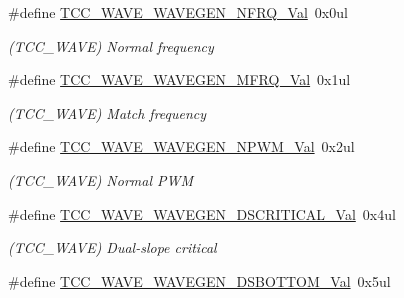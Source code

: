\begin{DoxyCompactItemize}
\item 
\hypertarget{group___s_a_m_l21___t_c_c_gaaf080c2e6207e177b2faf21b266b58b4}{}\#define \hyperlink{group___s_a_m_l21___t_c_c_gaaf080c2e6207e177b2faf21b266b58b4}{T\+C\+C\+\_\+\+W\+A\+V\+E\+\_\+\+W\+A\+V\+E\+G\+E\+N\+\_\+\+N\+F\+R\+Q\+\_\+\+Val}~0x0ul\label{group___s_a_m_l21___t_c_c_gaaf080c2e6207e177b2faf21b266b58b4}

\begin{DoxyCompactList}\small\item\em (T\+C\+C\+\_\+\+W\+A\+V\+E) Normal frequency \end{DoxyCompactList}\item 
\hypertarget{group___s_a_m_l21___t_c_c_ga71f3aa7f2d96d282e8db409c2b611efc}{}\#define \hyperlink{group___s_a_m_l21___t_c_c_ga71f3aa7f2d96d282e8db409c2b611efc}{T\+C\+C\+\_\+\+W\+A\+V\+E\+\_\+\+W\+A\+V\+E\+G\+E\+N\+\_\+\+M\+F\+R\+Q\+\_\+\+Val}~0x1ul\label{group___s_a_m_l21___t_c_c_ga71f3aa7f2d96d282e8db409c2b611efc}

\begin{DoxyCompactList}\small\item\em (T\+C\+C\+\_\+\+W\+A\+V\+E) Match frequency \end{DoxyCompactList}\item 
\hypertarget{group___s_a_m_l21___t_c_c_ga99a1d2484b970381acb1869d345d6787}{}\#define \hyperlink{group___s_a_m_l21___t_c_c_ga99a1d2484b970381acb1869d345d6787}{T\+C\+C\+\_\+\+W\+A\+V\+E\+\_\+\+W\+A\+V\+E\+G\+E\+N\+\_\+\+N\+P\+W\+M\+\_\+\+Val}~0x2ul\label{group___s_a_m_l21___t_c_c_ga99a1d2484b970381acb1869d345d6787}

\begin{DoxyCompactList}\small\item\em (T\+C\+C\+\_\+\+W\+A\+V\+E) Normal P\+W\+M \end{DoxyCompactList}\item 
\hypertarget{group___s_a_m_l21___t_c_c_ga8e5a9c817fedc6b9ebb78bec9843c5ce}{}\#define \hyperlink{group___s_a_m_l21___t_c_c_ga8e5a9c817fedc6b9ebb78bec9843c5ce}{T\+C\+C\+\_\+\+W\+A\+V\+E\+\_\+\+W\+A\+V\+E\+G\+E\+N\+\_\+\+D\+S\+C\+R\+I\+T\+I\+C\+A\+L\+\_\+\+Val}~0x4ul\label{group___s_a_m_l21___t_c_c_ga8e5a9c817fedc6b9ebb78bec9843c5ce}

\begin{DoxyCompactList}\small\item\em (T\+C\+C\+\_\+\+W\+A\+V\+E) Dual-\/slope critical \end{DoxyCompactList}\item 
\hypertarget{group___s_a_m_l21___t_c_c_gaa1a648a47c6844a5680d4c24efd28e30}{}\#define \hyperlink{group___s_a_m_l21___t_c_c_gaa1a648a47c6844a5680d4c24efd28e30}{T\+C\+C\+\_\+\+W\+A\+V\+E\+\_\+\+W\+A\+V\+E\+G\+E\+N\+\_\+\+D\+S\+B\+O\+T\+T\+O\+M\+\_\+\+Val}~0x5ul\label{group___s_a_m_l21___t_c_c_gaa1a648a47c6844a5680d4c24efd28e30}


\end{DoxyCompactItemize}
